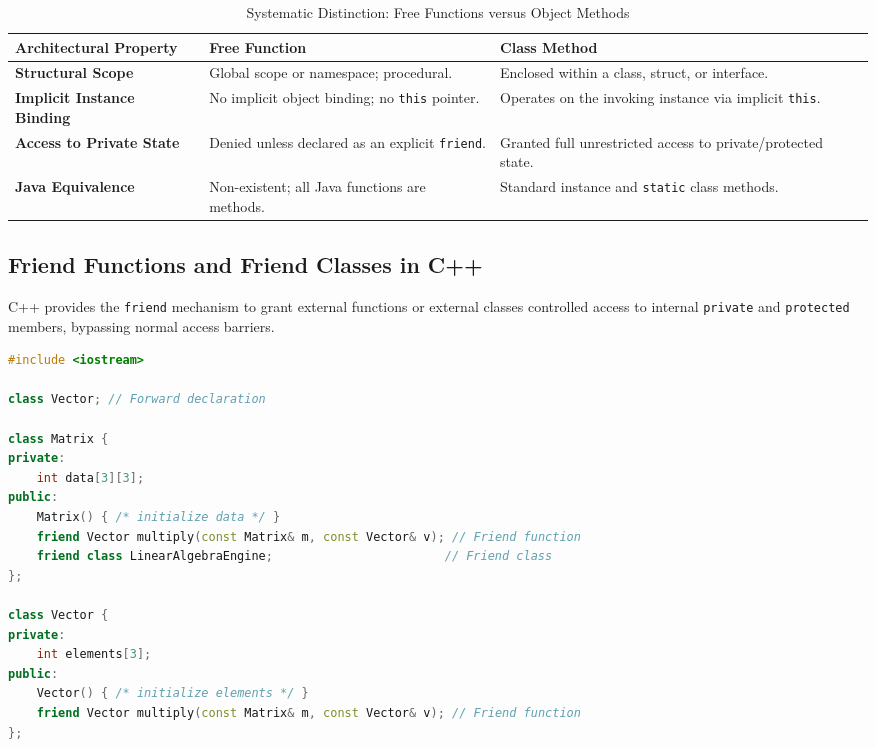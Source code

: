 \begin{table}[htbp]
\centering
\small
\begin{tabularx}{\textwidth}{l X X}
\toprule
\textbf{Architectural Property} & \textbf{Free Function} & \textbf{Class Method} \\
\midrule
\textbf{Structural Scope} & Global scope or namespace; procedural. & Enclosed within a class, struct, or interface. \\
\textbf{Implicit Instance Binding} & No implicit object binding; no \texttt{this} pointer. & Operates on the invoking instance via implicit \texttt{this}. \\
\textbf{Access to Private State} & Denied unless declared as an explicit \texttt{friend}. & Granted full unrestricted access to private/protected state. \\
\textbf{Java Equivalence} & Non-existent; all Java functions are methods. & Standard instance and \texttt{static} class methods. \\
\bottomrule
\end{tabularx}
\caption{Systematic Distinction: Free Functions versus Object Methods}
\label{tab:function_vs_method}
\end{table}

\subsection{Friend Functions and Friend Classes in C++}
C++ provides the \texttt{friend} mechanism to grant external functions or external classes controlled access to internal \texttt{private} and \texttt{protected} members, bypassing normal access barriers.

\begin{lstlisting}[language=C++]
#include <iostream>

class Vector; // Forward declaration

class Matrix {
private:
    int data[3][3];
public:
    Matrix() { /* initialize data */ }
    friend Vector multiply(const Matrix& m, const Vector& v); // Friend function
    friend class LinearAlgebraEngine;                        // Friend class
};

class Vector {
private:
    int elements[3];
public:
    Vector() { /* initialize elements */ }
    friend Vector multiply(const Matrix& m, const Vector& v); // Friend function
};
\end{lstlisting}

